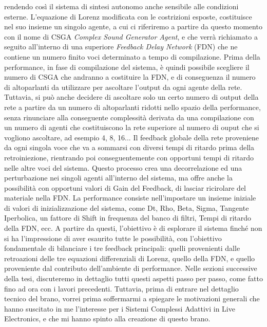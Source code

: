 rendendo così il sistema di sintesi autonomo anche sensibile alle condizioni esterne.
L'equazione di Lorenz modificata con le costrizioni esposte,
costituisce nel suo insieme un singolo agente, a cui ci riferiremo a partire da questo
momento con il nome di CSGA \textit{Complex Sound Generator Agent}, e che verrà richiamato a seguito
all'interno di una superiore \textit{Feedback Delay Network} (FDN) che ne contiene un 
numero finito voci determinato a tempo di compilazione. 
Prima della performance, in fase di compilazione del sistema,
è quindi possibile scegliere il numero di CSGA che andranno a costituire 
la FDN, e di conseguenza il numero di altoparlanti da utilizzare
per ascoltare l'output da ogni agente della rete.
Tuttavia, si può anche decidere di ascoltare solo un certo numero di output
della rete a partire da un numero di altoparlanti ridotti nello spazio della performance,
senza rinunciare alla conseguente complessità derivata da una compilazione con un
numero di agenti che costituiscono la rete superiore al numero di ouput che si vogliono ascoltare, 
ad esempio 4, 8, 16...
Il feedback globale della rete proveniene da ogni singola voce 
che va a sommarsi con diversi tempi di ritardo prima della retroiniezione,
rientrando poi conseguentemente con opportuni tempi di ritardo nelle altre voci del sistema.
Questo processo crea una decorrelazione ed una perturbazione nei singoli agenti all'interno del sistema,
ma offre anche la possibilità con opportuni valori di Gain del Feedback, 
di lasciar ricirolare del materiale nella FDN.
La performance consiste nell'impostare un insieme iniziale di valori 
di inizializzazione del sistema, come Dt, Rho, Beta, Sigma, 
Tangente Iperbolica, 
un fattore di Shift in frequenza del banco di filtri, 
Tempi di ritardo della FDN, ecc.
A partire da questi, l'obiettivo è di esplorare il sistema 
finché non si ha l'impressione di aver esaurito tutte le possibilità, 
con l'obiettivo fondamentale di bilanciare i tre feedback principali: 
quelli provenienti dalle retroazioni delle tre equazioni differenziali 
di Lorenz, quello della FDN, e quello proveniente dal contributo 
dell'ambiente di performance.
Nelle sezioni successive della tesi, 
discuteremo in dettaglio tutti questi aspetti passo per passo, 
come fatto fino ad ora con i lavori precedenti. 
Tuttavia, prima di entrare nel dettaglio tecnico del brano, 
vorrei prima soffermarmi a spiegare le motivazioni 
generali che hanno suscitato in me l'interesse per i 
Sistemi Complessi Adattivi in Live Electronics, 
e che mi hanno spinto alla creazione di questo brano. \\

